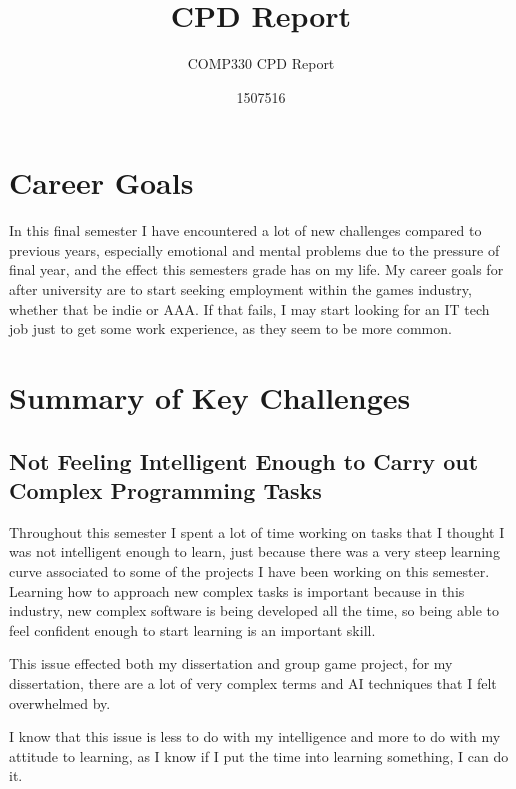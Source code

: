 \documentclass{scrartcl}
\title{CPD Report}
\subtitle{COMP330 CPD Report}
\author{1507516}
\begin{document}
\maketitle


\section{Career Goals}
In this final semester I have encountered a lot of new challenges compared to previous years, especially emotional and mental problems due to the pressure of final year, and the effect this semesters grade has on my life.
My career goals for after university are to start seeking employment within the games industry, whether that be indie or AAA. If that fails, I may start looking for an IT tech job just to get some work experience, as they seem to be more common.

\section{Summary of Key Challenges}


\subsection{Not Feeling Intelligent Enough to Carry out Complex Programming Tasks}
Throughout this semester I spent a lot of time working on tasks that I thought I was not intelligent enough to learn, just because there was a very steep learning curve associated to some of the projects I have been working on this semester.
Learning how to approach new complex tasks is important because in this industry, new complex software is being developed all the time, so being able to feel confident enough to start learning is an important skill.
\par

This issue effected both my dissertation and group game project, for my dissertation, there are a lot of very complex terms and AI techniques that I felt overwhelmed by.

\par

I know that this issue is less to do with my intelligence and more to do with my attitude to learning, as I know if I put the time into learning something, I can do it.
\end{document}
